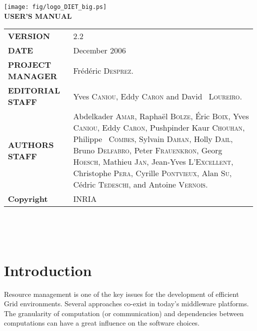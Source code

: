 \documentclass[12pt,a4paper]{book}
\newcommand{\dietversion}{2.2}
\begin{document}

\thispagestyle{empty}
\vspace*{3cm}
\vspace*{3cm}

\begin{center}
\texttt{[image: fig/logo\_DIET\_big.ps]}\\[2ex]
\textbf{\Huge USER'S MANUAL\\[2ex]}
\end{center}

\vfill

\noindent
\small{
\begin{tabular}{ll}
  \textbf{VERSION}  & \dietversion\\
  \textbf{DATE}     & December 2006\\
  \textbf{PROJECT MANAGER}  & Fr\'ed\'eric \textsc{Desprez}.\\
  \textbf{EDITORIAL STAFF}  & Yves \textsc{Caniou}, Eddy \textsc{Caron} and David ~\textsc{Loureiro}.\\
  \textbf{AUTHORS STAFF}    & 
\begin{minipage}[t]{12cm}
  Abdelkader \textsc{Amar}, Rapha\"el \textsc{Bolze}, \'Eric
  \textsc{Boix}, Yves \textsc{Caniou}, Eddy \textsc{Caron}, Pushpinder
  Kaur \textsc{Chouhan}, Philippe ~\textsc{Combes}, Sylvain
  \textsc{Dahan}, Holly \textsc{Dail}, Bruno \textsc{Delfabro}, Peter
  \textsc{Frauenkron}, Georg  \textsc{Hoesch}, Mathieu \textsc{Jan},
  Jean-Yves \textsc{L'Excellent}, Christophe \textsc{Pera}, Cyrille
  \textsc{Pontvieux}, Alan \textsc{Su}, C\'edric \textsc{Tedeschi},
  and Antoine \textsc{Vernois}.
\end{minipage} \\
  \textbf{Copyright}& INRIA
\end{tabular}\\
}

\newpage
\thispagestyle{empty}
\ 



\newpage
\tableofcontents


%
%
\newpage
{}
\chapter*{Introduction}

Resource management is one of the key issues for the development of
efficient Grid environments. Several approaches co-exist in today's
middleware platforms. The granularity of computation (or communication) and 
dependencies between computations can have a great influence on the
software choices.
\end{document}
